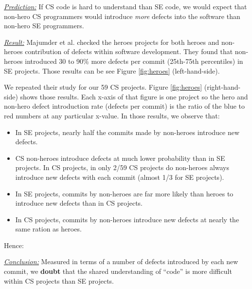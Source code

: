 \documentclass[sigconf,review,anonymous]{acmart}
\newcommand{\bi}{\begin{itemize}}
\newcommand{\ei}{\end{itemize}}
\newenvironment{RQ}{\vspace{1mm}\begin{tcolorbox}[enhanced,width=3.4in,size=fbox,colback=red!5!white,drop shadow southeast,sharp corners]}{\end{tcolorbox}}
\begin{document}
\noindent \textit{\underline{Prediction:}} If CS code is hard to understand than SE code, we would expect that non-hero CS programmers would
introduce {\em more} defects into the software than non-hero SE programmers. 

\noindent \textit{\underline{Result:}} Majumder et al. \cite{majumder19_heroes} checked the heroes projects for both heroes and non-heroes contribution of defects within software development. They found that non-heroes introduced 30 to 90\% more defects per commit (25th-75th percentiles) in SE projects. Those
results can be see Figure \ref{fig:heroes} (left-hand-side).

We repeated their study for our 59 CS projects.  Figure \ref{fig:heroes} (right-hand-side)
shows those results. Each x-axis of that figure is one project so the hero and non-hero defect introduction rate (defects per commit) is the ratio of the blue to red numbers
at any particular x-value.
In those results, we observe that:
\bi
\item In SE projects, nearly half the commits made by non-heroes introduce new defects.
\item CS non-heroes introduce defects at much lower probability than in SE projects. In CS projects, in only  2/59 CS projects do non-heroes always introduce new defects with each commit (almost 1/3 for SE projects).
\item In SE projects, commits by non-heroes are far more likely than heroes to introduce new defects than in CS projects.
\item
In CS projects, commits by non-heroes introduce new defects
at nearly the same ration as heroes.
\ei
Hence:

\begin{RQ}
\textit{\underline{Conclusion:}} Measured in terms
of a number of defects introduced by each new commit, we \textbf{doubt} that the shared understanding of ``code'' is more difficult within  CS projects than SE projects.
\end{RQ}



\end{document}
